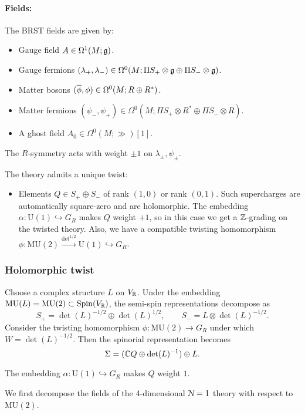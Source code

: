 \documentclass[10pt, oneside]{article}
\newcommand{\MU}{\mathrm{MU}}
\renewcommand{\U}{\mathrm{U}}
\begin{document}
\paragraph{Fields:} The BRST fields are given by:
\begin{itemize}
\item Gauge field $A \in \Omega^1(M; \fg)$.
\item Gauge fermions $(\lambda_+, \lambda_-) \in \Omega^0(M; \Pi S_+ \otimes \fg \oplus \Pi S_- \otimes \fg)$.
\item Matter bosons $(\Bar{\phi}, \phi) \in \Omega^0(M; R \oplus R^*)$.
\item Matter fermions $(\psi_-,\psi_+) \in \Omega^0(M; \Pi S_+ \otimes R^* \oplus \Pi S_- \otimes R)$.
\item A ghost field $A_0\in \Omega^0(M; \gg)[1]$.
\end{itemize}

The $R$-symmetry acts with weight $\pm 1$ on $\lambda_\pm, \psi_\pm$.

The theory admits a unique twist:
\begin{itemize}
\item Elements $Q\in S_+\oplus S_-$ of rank $(1, 0)$ or rank $(0, 1)$. Such supercharges are automatically square-zero and are holomorphic. The embedding $\alpha \colon \U(1) \hookrightarrow G_R$ makes $Q$ weight $+1$, so in this case we get a $\ZZ$-grading on the twisted theory. Also, we have a compatible twisting homomorphism $\phi\colon \MU(2)\xrightarrow{\det^{1/2}}\U(1)\hookrightarrow G_R$.
\end{itemize}

\subsubsection{Holomorphic twist}
\label{sect:4d1holomorphictwist}

Choose a complex structure $L$ on $V_\RR$. Under the embedding $\MU(L) = \MU(2) \subset \Spin(V_\RR)$, the semi-spin representations decompose as
\[
S_+ = \det(L)^{-1/2} \oplus \det(L)^{1/2},\qquad S_- = L \otimes \det(L)^{-1/2} .
\]
Consider the twisting homomorphism $\phi\colon\MU(2)\rightarrow G_R$ under which $W = \det(L)^{-1/2}$. Then the spinorial representation becomes
\[\Sigma = (\CC Q\oplus \det(L)^{-1})\oplus L.\]

The embedding $\alpha\colon \U(1)\hookrightarrow G_R$ makes $Q$ weight $1$.

We first decompose the fields of the 4-dimensional $\mc N=1$ theory with respect to $\MU(2)$.
\vspace{-10pt}
\end{document}
